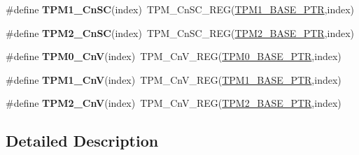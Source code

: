 \begin{DoxyCompactItemize}
\mbox{\label{group___t_p_m___register___accessor___macros_ga8e3ae6bd927b01c0448904eae9978681}} 
\#define {\bfseries T\+P\+M1\+\_\+\+Cn\+SC}(index)~T\+P\+M\+\_\+\+Cn\+S\+C\+\_\+\+R\+EG(\hyperlink{group___t_p_m___peripheral_ga3c3f533f8c87c74f2bbc3a4de83d1181}{T\+P\+M1\+\_\+\+B\+A\+S\+E\+\_\+\+P\+TR},index)
\item 
\mbox{\label{group___t_p_m___register___accessor___macros_ga38916e72b8c47d4bb613b67e84ae2c58}} 
\#define {\bfseries T\+P\+M2\+\_\+\+Cn\+SC}(index)~T\+P\+M\+\_\+\+Cn\+S\+C\+\_\+\+R\+EG(\hyperlink{group___t_p_m___peripheral_ga37cc120e7475fb646fe9bc15b57f06bc}{T\+P\+M2\+\_\+\+B\+A\+S\+E\+\_\+\+P\+TR},index)
\item 
\mbox{\label{group___t_p_m___register___accessor___macros_ga6d7fece02449611437af86de47ff98c8}} 
\#define {\bfseries T\+P\+M0\+\_\+\+CnV}(index)~T\+P\+M\+\_\+\+Cn\+V\+\_\+\+R\+EG(\hyperlink{group___t_p_m___peripheral_ga8ba6c6fb69345639750108c3289a24c4}{T\+P\+M0\+\_\+\+B\+A\+S\+E\+\_\+\+P\+TR},index)
\item 
\mbox{\label{group___t_p_m___register___accessor___macros_ga490064e6537a9cfd2c7d6e3603360721}} 
\#define {\bfseries T\+P\+M1\+\_\+\+CnV}(index)~T\+P\+M\+\_\+\+Cn\+V\+\_\+\+R\+EG(\hyperlink{group___t_p_m___peripheral_ga3c3f533f8c87c74f2bbc3a4de83d1181}{T\+P\+M1\+\_\+\+B\+A\+S\+E\+\_\+\+P\+TR},index)
\item 
\mbox{\label{group___t_p_m___register___accessor___macros_ga15826b335965333d95d30f9859750851}} 
\#define {\bfseries T\+P\+M2\+\_\+\+CnV}(index)~T\+P\+M\+\_\+\+Cn\+V\+\_\+\+R\+EG(\hyperlink{group___t_p_m___peripheral_ga37cc120e7475fb646fe9bc15b57f06bc}{T\+P\+M2\+\_\+\+B\+A\+S\+E\+\_\+\+P\+TR},index)
\end{DoxyCompactItemize}


\subsection{Detailed Description}
